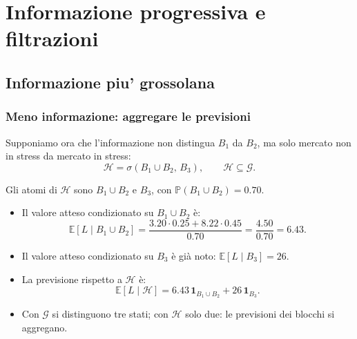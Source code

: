 \documentclass[handout]{beamer}%
\newenvironment{stepitemize}{\begin{itemize}[<+->]}{\end{itemize} }
\providecommand{\E}{\mathbb{E}}
\providecommand{\Prob}{\mathbb{P}}
\providecommand{\G}{\mathcal{G}}
\providecommand{\1}{\mathbf{1}}
\providecommand{\QTR}[2]{\csname #1\endcsname{#2}}
\begin{document}
\section{Informazione progressiva e filtrazioni}

\subsection{Informazione piu' grossolana}%

\begin{frame}%
%

\frametitle{Meno informazione: aggregare le previsioni}%
%

%


Supponiamo ora che l'informazione non distingua $B_{1}$ da $B_{2}$, ma solo
mercato non in stress da mercato in stress:
\[
\mathcal{H} = \sigma(B_{1}\cup B_{2},\, B_{3}), \qquad\mathcal{H}
\subseteq\G.
\]


Gli atomi di $\mathcal{H}$ sono $B_{1}\cup B_{2}$ e $B_{3}$, con
$\Prob(B_{1}\cup B_{2})=0.70$.

\medskip

\begin{stepitemize}
\item Il valore atteso condizionato su $B_{1}\cup B_{2}$ \`{e}:
\[
\E[L\mid B_1\cup B_2] = \frac{3.20\cdot0.25 + 8.22\cdot0.45}{0.70} =
\frac{4.50}{0.70} = 6.43.
\]


\item Il valore atteso condizionato su $B_{3}$ \`{e} gi\`{a} noto:
$\E[L\mid B_3]=26$.

\item La previsione rispetto a $\mathcal{H}$ \`{e}:
\[
\E[L\mid\mathcal{H}] = 6.43\,\1_{B_{1}\cup B_{2}} + 26\,\1_{B_{3}}.
\]


\item \textcolor{light-blue}{Con $\G$ si distinguono tre stati; con
$\mathcal{H}$ solo due: le previsioni dei blocchi si aggregano.}
\end{stepitemize}%

\transboxout
\end{frame}%
\end{document}
